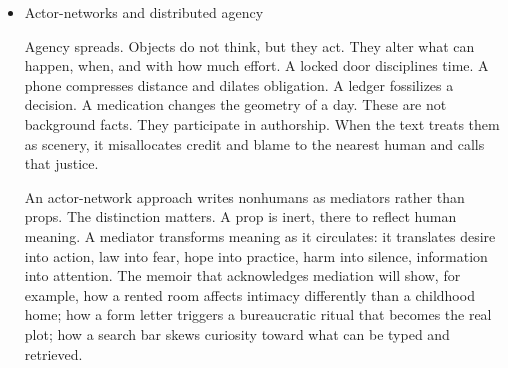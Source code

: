 \documentclass[11pt]{article}
\begin{document}
\begin{itemize}
Transformation occurs when a loop stops returning to its previous shape. The causes are varied. A small parameter changes (a word, a cost, a schedule), and the system enters a new rhythm. Two incompatible directives collide and force invention. A resource disappears or a new mediator enters and makes prior paths inefficient. From the inside, these shifts feel like mood or fate or breakthrough. From the outside, they look like phase change: the cooling of one habit, the crystallization of another.

Narrative can register this ecological process in several ways. It can show a configuration working as designed until an internal contradiction accumulates pressure. It can make visible the thresholds at which a familiar pattern becomes unsustainable. It can mark the moment the system learns: when behavior that used to produce stability now produces noise, and a different behavior reduces the noise instead. The plot ceases to be a string of events. It becomes a history of adjustments.

This ecological lens does not erase culpability. It contextualizes it. To say that a choice emerged from a loop is not to excuse the chooser. It is to specify the conditions under which the choice became likely, legible, or unimaginably difficult. Precision of cause allows precision of judgment.
\item Actor-networks and distributed agency
\label{sec:org6662881}

Agency spreads. Objects do not think, but they act. They alter what can happen, when, and with how much effort. A locked door disciplines time. A phone compresses distance and dilates obligation. A ledger fossilizes a decision. A medication changes the geometry of a day. These are not background facts. They participate in authorship. When the text treats them as scenery, it misallocates credit and blame to the nearest human and calls that justice.

An actor-network approach writes nonhumans as mediators rather than props. The distinction matters. A prop is inert, there to reflect human meaning. A mediator transforms meaning as it circulates: it translates desire into action, law into fear, hope into practice, harm into silence, information into attention. The memoir that acknowledges mediation will show, for example, how a rented room affects intimacy differently than a childhood home; how a form letter triggers a bureaucratic ritual that becomes the real plot; how a search bar skews curiosity toward what can be typed and retrieved.


\end{itemize}
\end{document}
